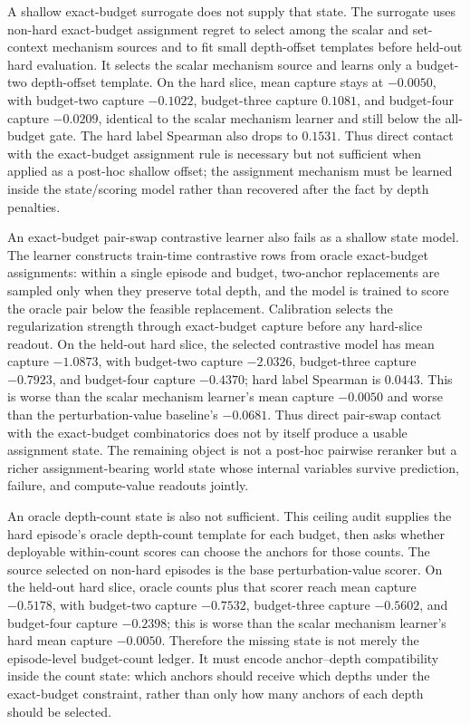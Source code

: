 A shallow exact-budget surrogate does not supply that state.  The surrogate
uses non-hard exact-budget assignment regret to select among the scalar and
set-context mechanism sources and to fit small depth-offset templates before
held-out hard evaluation.  It selects the scalar mechanism source and learns
only a budget-two depth-offset template.  On the hard slice, mean capture stays
at $-0.0050$, with budget-two capture $-0.1022$, budget-three capture
$0.1081$, and budget-four capture $-0.0209$, identical to the scalar mechanism
learner and still below the all-budget gate.  The hard label Spearman also
drops to $0.1531$.  Thus direct contact with the exact-budget assignment rule
is necessary but not sufficient when applied as a post-hoc shallow offset; the
assignment mechanism must be learned inside the state/scoring model rather than
recovered after the fact by depth penalties.

An exact-budget pair-swap contrastive learner also fails as a shallow state
model.  The learner constructs train-time contrastive rows from oracle
exact-budget assignments: within a single episode and budget, two-anchor
replacements are sampled only when they preserve total depth, and the model is
trained to score the oracle pair below the feasible replacement.  Calibration
selects the regularization strength through exact-budget capture before any
hard-slice readout.  On the held-out hard slice, the selected contrastive model
has mean capture $-1.0873$, with budget-two capture $-2.0326$, budget-three
capture $-0.7923$, and budget-four capture $-0.4370$; hard label Spearman is
$0.0443$.  This is worse than the scalar mechanism learner's mean capture
$-0.0050$ and worse than the perturbation-value baseline's $-0.0681$.  Thus
direct pair-swap contact with the exact-budget combinatorics does not by itself
produce a usable assignment state.  The remaining object is not a post-hoc
pairwise reranker but a richer assignment-bearing world state whose internal
variables survive prediction, failure, and compute-value readouts jointly.

An oracle depth-count state is also not sufficient.  This ceiling audit supplies
the hard episode's oracle depth-count template for each budget, then asks whether
deployable within-count scores can choose the anchors for those counts.  The
source selected on non-hard episodes is the base perturbation-value scorer.  On
the held-out hard slice, oracle counts plus that scorer reach mean capture
$-0.5178$, with budget-two capture $-0.7532$, budget-three capture $-0.5602$,
and budget-four capture $-0.2398$; this is worse than the scalar mechanism
learner's hard mean capture $-0.0050$.  Therefore the missing state is not
merely the episode-level budget-count ledger.  It must encode anchor--depth
compatibility inside the count state: which anchors should receive which depths
under the exact-budget constraint, rather than only how many anchors of each
depth should be selected.

